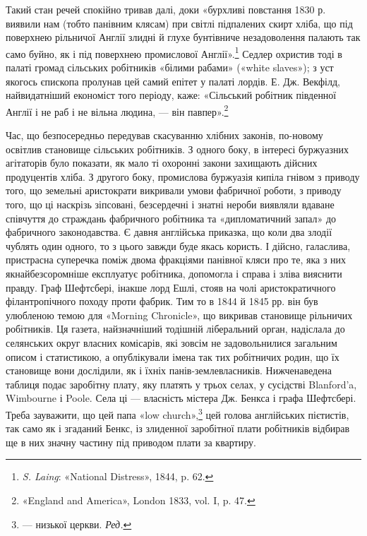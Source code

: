 Такий стан речей спокійно тривав далі, доки «бурхливі повстання
1830 р. виявили нам (тобто панівним клясам) при світлі
підпалених скирт хліба, що під поверхнею рільничої Англії
злидні й глухе бунтівниче незадоволення палають так само буйно,
як і під поверхнею промислової Англії».\footnote{
\emph{S. Laing}: «National Distress», 1844, p. 62.
} Седлер охристив тоді
в палаті громад сільських робітників «білими рабами» («white
slaves»); з уст якогось єпископа пролунав цей самий епітет у палаті
лордів. Е. Дж. Векфілд, найвидатніший економіст того періоду,
каже: «Сільський робітник південної Англії і не раб
і не вільна людина, — він павпер».\footnote{
«England and America», London 1833, vol. I, p. 47.
}

Час, що безпосередньо передував скасуванню хлібних законів,
по-новому освітлив становище сільських робітників. З одного
боку, в інтересі буржуазних агітаторів було показати, як
мало ті охоронні закони захищають дійсних продуцентів хліба.
З другого боку, промислова буржуазія кипіла гнівом з приводу
того, що земельні аристократи викривали умови фабричної роботи,
з приводу того, що ці наскрізь зіпсовані, безсердечні і
знатні нероби виявляли вдаване співчуття до страждань фабричного
робітника та «дипломатичний запал» до фабричного законодавства.
Є давня англійська приказка, що коли два злодії
чублять один одного, то з цього завжди буде якась користь.
І дійсно, галаслива, пристрасна суперечка поміж двома фракціями
панівної кляси про те, яка з них якнайбезсоромніше експлуатує
робітника, допомогла і справа і зліва вияснити правду. Граф
Шефтсбері, інакше лорд Ешлі, стояв на чолі аристократичного
філантропічного походу проти фабрик. Тим то в 1844 й
1845 рр. він був улюбленою темою для «Morning Chronicle», що
викривав становище рільничих робітників. Ця газета, найзначніший
тодішній ліберальний орган, надіслала до селянських округ
власних комісарів, які зовсім не задовольнилися загальним
описом і статистикою, а опублікували імена так тих робітничих
родин, що їх становище вони дослідили, як і їхніх панів-землевласників.
Нижченаведена таблиця подає заробітну плату,
яку платять у трьох селах, у сусідстві Blanford’a, Wimbourne
і Poole. Села ці — власність містера Дж. Бенкса і графа Шефтсбері.
Треба зауважити, що цей папа «low church»,\footnote*{
— низької церкви. \emph{Ред.}
} цей голова англійських
пієтистів, так само як і згаданий Бенкс, із злиденної
заробітної плати робітників відбирав ще в них значну частину
під приводом плати за квартиру.

